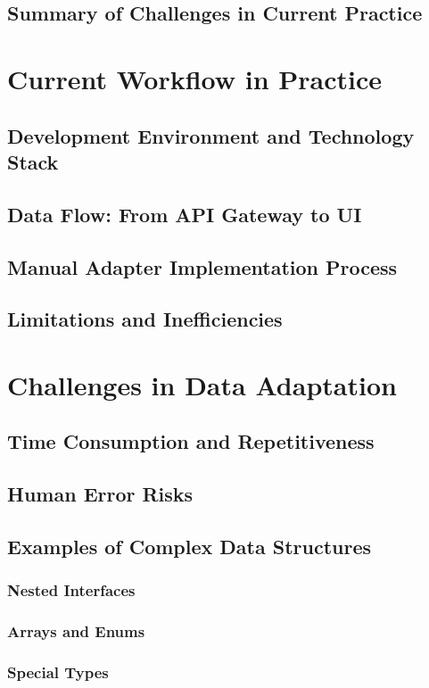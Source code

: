 \documentclass[12pt,a4paper]{article}
\begin{document}
  \subsection{Summary of Challenges in Current Practice}

\section{Current Workflow in Practice} %
  \subsection{Development Environment and Technology Stack}
  \subsection{Data Flow: From API Gateway to UI}
  \subsection{Manual Adapter Implementation Process}
  \subsection{Limitations and Inefficiencies}

\section{Challenges in Data Adaptation} %
  \subsection{Time Consumption and Repetitiveness}
  \subsection{Human Error Risks}
  \subsection{Examples of Complex Data Structures}
    \subsubsection{Nested Interfaces}
    \subsubsection{Arrays and Enums}
    \subsubsection{Special Types}
\end{document}
